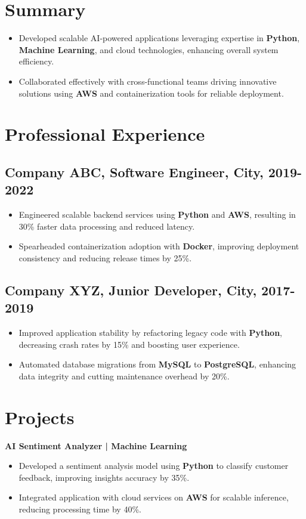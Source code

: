 \address{123 Main St, City, Country}

\section{Summary}
\begin{itemize}
\item Developed scalable AI-powered applications leveraging expertise in \textbf{Python}, \textbf{Machine Learning}, and cloud technologies, enhancing overall system efficiency.
\item Collaborated effectively with cross-functional teams driving innovative solutions using \textbf{AWS} and containerization tools for reliable deployment.
\end{itemize}

\section{Professional Experience}
\subsection{Company ABC, Software Engineer, City, 2019-2022}
\begin{itemize}
\item Engineered scalable backend services using \textbf{Python} and \textbf{AWS}, resulting in 30\% faster data processing and reduced latency.
\item Spearheaded containerization adoption with \textbf{Docker}, improving deployment consistency and reducing release times by 25\%.
\end{itemize}
\subsection{Company XYZ, Junior Developer, City, 2017-2019}
\begin{itemize}
\item Improved application stability by refactoring legacy code with \textbf{Python}, decreasing crash rates by 15\% and boosting user experience.
\item Automated database migrations from \textbf{MySQL} to \textbf{PostgreSQL}, enhancing data integrity and cutting maintenance overhead by 20\%.
\end{itemize}

\section{Projects}
\textbf{AI Sentiment Analyzer | Machine Learning}
\begin{itemize}
\item Developed a sentiment analysis model using \textbf{Python} to classify customer feedback, improving insights accuracy by 35\%.
\item Integrated application with cloud services on \textbf{AWS} for scalable inference, reducing processing time by 40\%.
\end{itemize}

